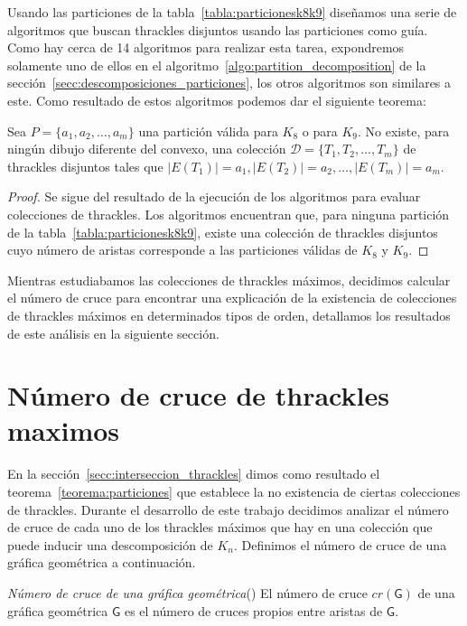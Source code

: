     Usando las particiones de la tabla~\ref{tabla:particionesk8k9} diseñamos
    una serie de algoritmos que buscan thrackles disjuntos usando las particiones como guía.
    Como hay cerca de 14 algoritmos para realizar esta tarea, expondremos solamente
    uno de ellos en el algoritmo~\ref{algo:partition_decomposition} de la sección~\ref{secc:descomposiciones_particiones}, los
    otros algoritmos son similares a este. Como resultado de estos algoritmos podemos dar el
    siguiente teorema:
    \begin{theorem}\label{teorema:particiones}
      Sea $P=\{a_1,a_2,\dots,a_m\}$ una partición válida para $K_8$ o para $K_9$. No existe, para
      ningún dibujo diferente del convexo, una colección $\mathcal{D}=\{T_1,T_2,\dots,T_m\}$ de
      thrackles disjuntos tales que $|E(T_1)|=a_1,|E(T_2)|=a_2,\dots,|E(T_m)|=a_m$.
    \end{theorem}
    \begin{proof}
      Se sigue del resultado de la ejecución de los algoritmos para evaluar colecciones de
      thrackles. Los algoritmos encuentran que, para ninguna partición de la
      tabla~\ref{tabla:particionesk8k9}, existe una colección de thrackles disjuntos cuyo número de
      aristas corresponde a las particiones válidas de $K_8$ y $K_9$.
    \end{proof}

Mientras estudiabamos las colecciones de thrackles máximos, decidimos calcular el número
de cruce para encontrar una explicación de la existencia de colecciones de thrackles
máximos en determinados tipos de orden, detallamos los resultados de este análisis en la
siguiente sección.
\section{Número de cruce de thrackles maximos }\label{secc:cnthracklemax}

En la sección~\ref{secc:interseccion_thrackles} dimos como resultado el
teorema~\ref{teorema:particiones} que establece la no existencia de ciertas colecciones
de thrackles. Durante el desarrollo de este trabajo decidimos analizar el número de cruce
de cada uno de los thrackles máximos que hay en una colección que puede inducir una
descomposición de $K_n$. Definimos el número de cruce de una gráfica geométrica a continuación.

\begin{definition}{\emph{Número de cruce de una gráfica geométrica}(\cite{Schaefer2018})}
  El número de cruce $cr(\mathsf{G})$ de una gráfica geométrica $\mathsf{G}$
  es el número de cruces propios entre aristas de $\mathsf{G}$.
\end{definition}

